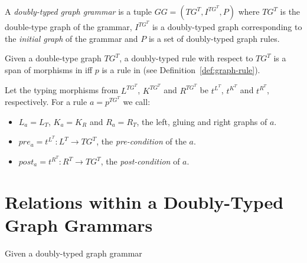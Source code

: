 \begin{definition} A \emph{doubly-typed graph grammar} is a tuple $GG = \left(TG^T, I^{TG^T},P \right)$ where $TG^T$ is the double-type graph of the grammar, $I^{TG^T}$ is a doubly-typed graph corresponding to the \emph{initial graph} of the grammar and $P$ is a set of doubly-typed graph rules. 
\end{definition}

\begin{definition} Given a double-type graph $TG^T$, a doubly-typed rule with respect to $TG^T$ is a span of morphisms \doublyTypedRule{} in \doublyTypedGraphCategory{} iff $p$ is a rule in \typedGraphCategory{} (see Definition~\ref{def:graph-rule}).

  Let the typing morphisms from $L^{TG^T}$, $K^{TG^T}$ and $R^{TG^T}$ be $t^{L^T}$, $t^{K^T}$ and $t^{R^T}$, respectively. For a rule $a = p^{TG^T}$ we call:

  \begin{itemize}
    \item $L_a = L_T$, $K_a = K_R$ and $R_a = R_T$, the left, gluing and right graphs of $a$.
    \item $pre_a = t^{L^T} : L^T \rightarrow TG^T$, the \emph{pre-condition} of the $a$.
    \item $post_a = t^{R^T} : R^T \rightarrow TG^T$, the \emph{post-condition} of $a$.
  \end{itemize}
\end{definition}

\section{Relations within a Doubly-Typed Graph Grammars}


\begin{definition} Given a doubly-typed graph grammar \doublyTypedGraphGrammarCore{}
\end{definition}

\begin{definition}
\end{definition}

